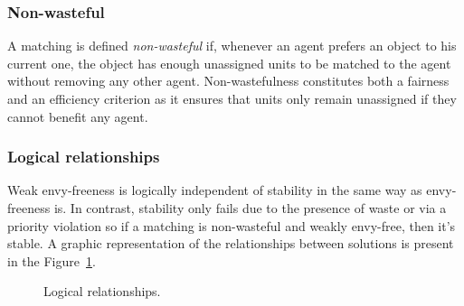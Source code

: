 \subsubsection{Non-wasteful}%

A matching is defined \textit{non-wasteful} if, whenever an agent prefers an object to his current one, the object has enough unassigned units to be matched to the agent without removing any other agent. Non-wastefulness constitutes both a fairness and an efficiency criterion as it ensures that units only remain unassigned if they cannot benefit any agent.


\subsubsection{Logical relationships}%

Weak envy-freeness is logically independent of stability in the same way as envy-freeness is. In contrast, stability only fails due to the presence of waste or via a priority violation so if a matching is non-wasteful and weakly envy-free, then it's stable. A graphic representation of the relationships between solutions is present in the Figure~\ref{fig:matching}.

\begin{figure}[!htb]
    \def\svgwidth{\columnwidth}
    
    \caption{Logical relationships.}
    \label{fig:matching}
\end{figure}
